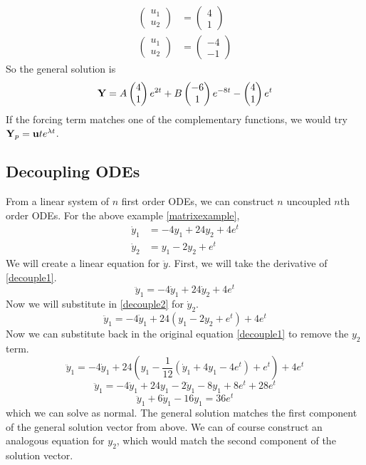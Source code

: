 \begin{align*}
\begin{pmatrix}
		             u_1 \\ u_2
	             \end{pmatrix}                   & = \begin{pmatrix}
		                                                 4 \\ 1
	                                                 \end{pmatrix}                              \\
	\begin{pmatrix}
		u_1 \\ u_2
	\end{pmatrix}                                & = \begin{pmatrix}
		                                                 -4 \\ -1
	                                                 \end{pmatrix}
\end{align*}
So the general solution is
\[
	\vb Y = A\begin{pmatrix}
		4 \\ 1
	\end{pmatrix}e^{2t} + B\begin{pmatrix}
		-6 \\ 1
	\end{pmatrix}e^{-8t} - \begin{pmatrix}
		4 \\ 1
	\end{pmatrix}e^t
\]
If the forcing term matches one of the complementary functions, we would try \(\vb Y_p = \vb u te^{\lambda t}\).

\subsection{Decoupling ODEs}
From a linear system of \(n\) first order ODEs, we can construct \(n\) uncoupled \(n\)th order ODEs.
For the above example \eqref{matrixexample},
\begin{align}
	\label{decouple1} \dot y_1 & = -4y_1 + 24y_2 + 4e^t \\
	\label{decouple2} \dot y_2 & = y_1 - 2y_2 + e^t
\end{align}
We will create a linear equation for \(\ddot y\).
First, we will take the derivative of \eqref{decouple1}.
\[
	\ddot y_1 = -4\dot y_1 + 24\dot y_2 + 4e^t
\]
Now we will substitute in \eqref{decouple2} for \(\dot y_2\).
\[
	\ddot y_1 = -4\dot y_1 + 24(y_1 - 2y_2 + e^t) + 4e^t
\]
Now we can substitute back in the original equation \eqref{decouple1} to remove the \(y_2\) term.
\[
	\ddot y_1 = -4\dot y_1 + 24\left(y_1 - \frac{1}{12}(\dot y_1 + 4y_1 - 4e^t) + e^t\right) + 4e^t
\]
\[
	\ddot y_1 = -4\dot y_1 + 24y_1 - 2\dot y_1 - 8y_1 + 8e^t + 28e^t
\]
\[
	\ddot y_1 + 6\dot y_1 - 16y_1 = 36e^t
\]
which we can solve as normal.
The general solution matches the first component of the general solution vector from above.
We can of course construct an analogous equation for \(y_2\), which would match the second component of the solution vector.


